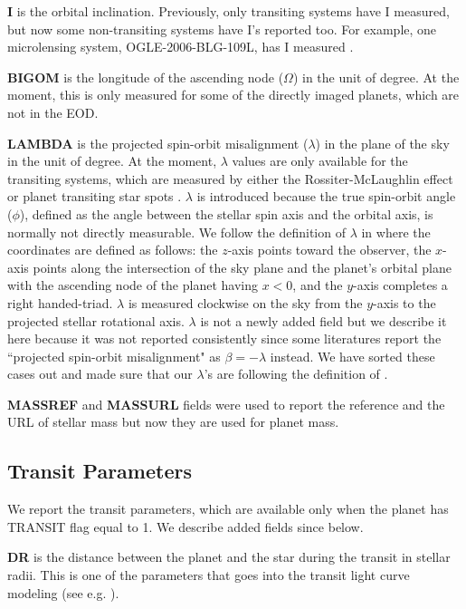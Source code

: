 \documentclass[11pt,preprint]{aastex}
\begin{document}
\begin{CJK*}{UTF8}{gbsn}
{\bf I} is the orbital inclination. Previously, only transiting
systems have I measured, but now some non-transiting systems
have I's reported too. For example, one microlensing system,
OGLE-2006-BLG-109L, has I measured \citep{Bennett2010}.

{\bf BIGOM} is the longitude of the ascending node ($\Omega$) in the
unit of degree. At the moment, this is only measured for some of the
directly imaged planets, which are not in the EOD.

{\bf LAMBDA} is the projected spin-orbit misalignment ($\lambda$) in
the plane of the sky in the unit of degree. At the moment, $\lambda$
values are only available for the transiting systems, which are
measured by either the Rossiter-McLaughlin effect
\citep[e.g.,][]{Winn2005} or planet transiting star spots
\citep[e.g.,][]{Sanchis-Ojeda2012}. $\lambda$ is introduced because
the true spin-orbit angle ($\phi$), defined as the angle between the
stellar spin axis and the orbital axis, is normally not directly
measurable. We follow the definition of $\lambda$ in
\cite{Fabrycky2009} where the coordinates are defined as follows: the
$z$-axis points toward the observer, the $x$-axis points along the
intersection of the sky plane and the planet's orbital plane with the
ascending node of the planet having $x<0$, and the $y$-axis completes
a right handed-triad. $\lambda$ is measured clockwise on the sky from
the $y$-axis to the projected stellar rotational axis. $\lambda$ is
not a newly added field but we describe it here because it was not
reported consistently since some literatures report the ``projected
spin-orbit misalignment" as $\beta = -\lambda$ instead. We have sorted
these cases out and made sure that our $\lambda$'s are following the
definition of \cite{Fabrycky2009}.

{\bf MASSREF} and {\bf MASSURL} fields were used to report the
reference and the URL of stellar mass but now they are used for planet
mass.

\subsection{Transit Parameters}\label{sec:transit}

We report the transit parameters, which are available only when the
planet has TRANSIT flag equal to 1. We describe added fields since
\cite{Wright2011} below.

{\bf DR} is the distance between the planet and the star during the
transit in stellar radii. This is one of the parameters that goes into
the transit light curve modeling (see e.g. \citealt{Batalha2013}).


\end{CJK*}
\end{document}
